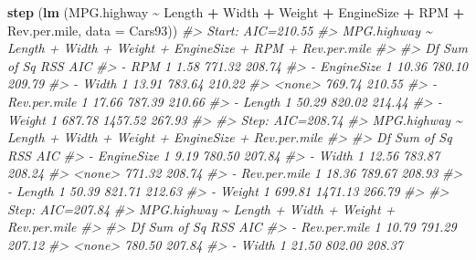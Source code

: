 \documentclass[
]{book}
\newenvironment{Shaded}{\begin{snugshade}}{\end{snugshade}}
\newcommand{\AttributeTok}[1]{\textcolor[rgb]{0.13,0.29,0.53}{#1}}
\newcommand{\CommentTok}[1]{\textcolor[rgb]{0.56,0.35,0.01}{\textit{#1}}}
\newcommand{\FunctionTok}[1]{\textcolor[rgb]{0.13,0.29,0.53}{\textbf{#1}}}
\newcommand{\NormalTok}[1]{#1}
\newcommand{\SpecialCharTok}[1]{\textcolor[rgb]{0.81,0.36,0.00}{\textbf{#1}}}
\begin{document}
\begin{Shaded}
\begin{Highlighting}[]
\FunctionTok{step}\NormalTok{ (}\FunctionTok{lm}\NormalTok{ (MPG.highway }\SpecialCharTok{\textasciitilde{}}\NormalTok{ Length }\SpecialCharTok{+}\NormalTok{ Width }\SpecialCharTok{+}\NormalTok{ Weight }\SpecialCharTok{+}\NormalTok{ EngineSize }\SpecialCharTok{+}\NormalTok{ RPM }\SpecialCharTok{+} 
\NormalTok{            Rev.per.mile, }\AttributeTok{data =}\NormalTok{ Cars93))}
\CommentTok{\#\textgreater{} Start:  AIC=210.55}
\CommentTok{\#\textgreater{} MPG.highway \textasciitilde{} Length + Width + Weight + EngineSize + RPM + Rev.per.mile}
\CommentTok{\#\textgreater{} }
\CommentTok{\#\textgreater{}                Df Sum of Sq     RSS    AIC}
\CommentTok{\#\textgreater{} {-} RPM           1      1.58  771.32 208.74}
\CommentTok{\#\textgreater{} {-} EngineSize    1     10.36  780.10 209.79}
\CommentTok{\#\textgreater{} {-} Width         1     13.91  783.64 210.22}
\CommentTok{\#\textgreater{} \textless{}none\textgreater{}                       769.74 210.55}
\CommentTok{\#\textgreater{} {-} Rev.per.mile  1     17.66  787.39 210.66}
\CommentTok{\#\textgreater{} {-} Length        1     50.29  820.02 214.44}
\CommentTok{\#\textgreater{} {-} Weight        1    687.78 1457.52 267.93}
\CommentTok{\#\textgreater{} }
\CommentTok{\#\textgreater{} Step:  AIC=208.74}
\CommentTok{\#\textgreater{} MPG.highway \textasciitilde{} Length + Width + Weight + EngineSize + Rev.per.mile}
\CommentTok{\#\textgreater{} }
\CommentTok{\#\textgreater{}                Df Sum of Sq     RSS    AIC}
\CommentTok{\#\textgreater{} {-} EngineSize    1      9.19  780.50 207.84}
\CommentTok{\#\textgreater{} {-} Width         1     12.56  783.87 208.24}
\CommentTok{\#\textgreater{} \textless{}none\textgreater{}                       771.32 208.74}
\CommentTok{\#\textgreater{} {-} Rev.per.mile  1     18.36  789.67 208.93}
\CommentTok{\#\textgreater{} {-} Length        1     50.39  821.71 212.63}
\CommentTok{\#\textgreater{} {-} Weight        1    699.81 1471.13 266.79}
\CommentTok{\#\textgreater{} }
\CommentTok{\#\textgreater{} Step:  AIC=207.84}
\CommentTok{\#\textgreater{} MPG.highway \textasciitilde{} Length + Width + Weight + Rev.per.mile}
\CommentTok{\#\textgreater{} }
\CommentTok{\#\textgreater{}                Df Sum of Sq     RSS    AIC}
\CommentTok{\#\textgreater{} {-} Rev.per.mile  1     10.79  791.29 207.12}
\CommentTok{\#\textgreater{} \textless{}none\textgreater{}                       780.50 207.84}
\CommentTok{\#\textgreater{} {-} Width         1     21.50  802.00 208.37}

\end{Highlighting}
\end{Shaded}
\end{document}
